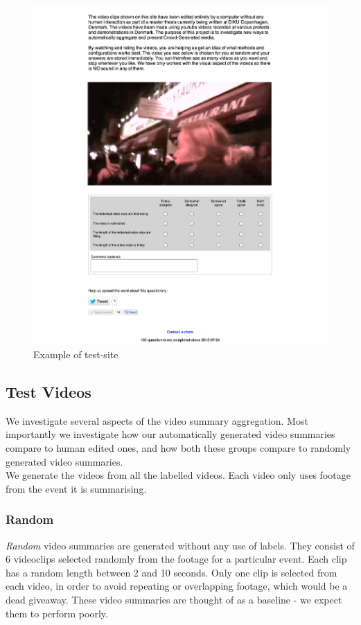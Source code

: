 \begin{figure}
     \centering
     \includegraphics[width=1.0\textwidth]{img/website.png}
     \caption{Example of test-site}\label{fig:website}
\end{figure}
%
\subsection{Test Videos}
%
We investigate several aspects of the video summary aggregation. Most importantly we investigate how our automatically generated video summaries compare to human edited ones, and how both these groups compare to randomly generated video summaries.\\
We generate the videos from all the labelled videos. Each video only uses footage from the event it is summarising.
%
\subsubsection{Random}
%
\textit{Random} video summaries are generated without any use of labels. They consist of 6 videoclips selected randomly from the footage for a particular event. Each clip has a random length between 2 and 10 seconds. Only one clip is selected from each video, in order to avoid repeating or overlapping footage, which would be a dead giveaway. These video summaries are thought of as a baseline - we expect them to perform poorly.
%
